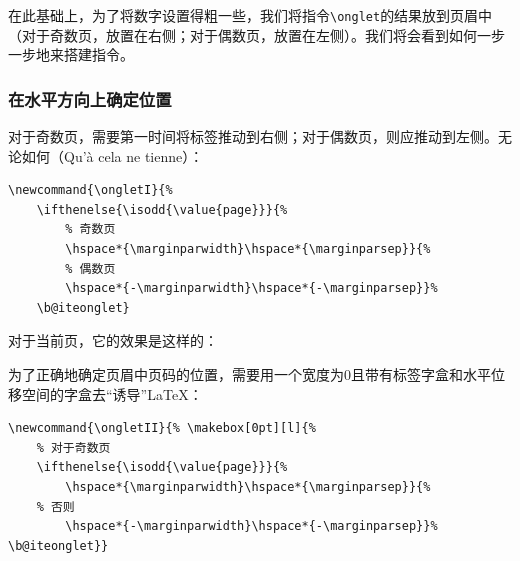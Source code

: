 在此基础上，为了将数字设置得粗一些，我们将指令\verb|\onglet|的结果放到页眉中（对于奇数页，放置在右侧；对于偶数页，放置在左侧）。我们将会看到如何一步一步地来搭建指令。

\subsubsection{在水平方向上确定位置}

对于奇数页，需要第一时间将标签推动到右侧；对于偶数页，则应推动到左侧。无论如何（Qu'à cela ne tienne）：

\begin{dmd}
\begin{verbatim}
\newcommand{\ongletI}{% 
    \ifthenelse{\isodd{\value{page}}}{%
        % 奇数页 
        \hspace*{\marginparwidth}\hspace*{\marginparsep}}{% 
        % 偶数页 
        \hspace*{-\marginparwidth}\hspace*{-\marginparsep}}%
    \b@iteonglet}
\end{verbatim}
\end{dmd}

对于当前页，它的效果是这样的：

\newcommand{\ongletI}{%
    \ifthenelse{\isodd{\value{page}}}{%
      \hspace*{\marginparwidth}\hspace*{\marginparsep}}{%
      \hspace*{-\marginparwidth}\hspace*{-\marginparsep}}%
    \biteonglet}

\ifthenelse{\isodd{\value{page}}}{%
  \begin{flushright}
    \bfseries\thepage\ongletI\\
    \rule{\textwidth}{.4pt}
  \end{flushright}}{%
  \begin{flushleft}
  \ongletI\bfseries\thepage\\
    \rule{\textwidth}{.4pt}
  \end{flushleft}}


为了正确地确定页眉中页码的位置，需要用一个宽度为0且带有标签字盒和水平位移空间的字盒去“诱导”\LaTeX ：

\begin{dmd}
\begin{verbatim}
\newcommand{\ongletII}{% \makebox[0pt][l]{%
    % 对于奇数页
    \ifthenelse{\isodd{\value{page}}}{%
        \hspace*{\marginparwidth}\hspace*{\marginparsep}}{% 
    % 否则
        \hspace*{-\marginparwidth}\hspace*{-\marginparsep}}% \b@iteonglet}}
\end{verbatim}
\end{dmd}

